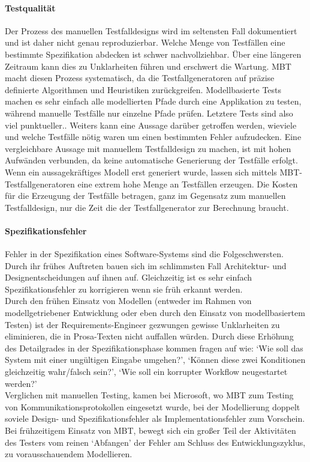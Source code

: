 \paragraph{Testqualität} Der Prozess des manuellen Testfalldesigns wird im seltensten Fall dokumentiert und ist daher nicht genau reproduzierbar. Welche Menge von Testfällen eine bestimmte Spezifikation abdecken ist schwer nachvollziehbar. Über eine längeren Zeitraum kann dies zu Unklarheiten führen und erschwert die Wartung\cite{utting_practical_2007}. MBT macht diesen Prozess systematisch, da die Testfallgeneratoren auf präzise definierte Algorithmen und Heuristiken zurückgreifen. Modellbasierte Tests machen es sehr einfach alle modellierten Pfade durch eine Applikation zu testen, während manuelle Testfälle nur einzelne Pfade prüfen. Letztere Tests sind also viel punktueller.. Weiters kann eine Aussage darüber getroffen werden, wieviele und welche Testfälle nötig waren um einen bestimmten Fehler aufzudecken. Eine vergleichbare Aussage mit manuellem Testfalldesign zu machen, ist mit hohen Aufwänden verbunden, da keine automatische Generierung der Testfälle erfolgt.\\
Wenn ein aussagekräftiges Modell erst generiert wurde, lassen sich mittels MBT-Testfallgeneratoren eine extrem hohe Menge an Testfällen erzeugen. Die Kosten für die Erzeugung der Testfälle betragen, ganz im Gegensatz zum manuellen Testfalldesign, nur die Zeit die der Testfallgenerator zur Berechnung braucht.

\paragraph{Spezifikationsfehler}
Fehler in der Spezifikation eines Software-Systems sind die Folgeschwersten\cite{utting_practical_2007}. Durch ihr frühes Auftreten bauen sich im schlimmsten Fall Architektur- und Designentscheidungen auf ihnen auf. Gleichzeitig ist es sehr einfach Spezifikationsfehler zu korrigieren wenn sie früh erkannt werden.\\
Durch den frühen Einsatz von Modellen (entweder im Rahmen von modellgetriebener Entwicklung oder eben durch den Einsatz von modellbasiertem Testen) ist der Requirements-Engineer gezwungen gewisse Unklarheiten zu eliminieren, die in Prosa-Texten nicht auffallen würden. Durch diese Erhöhung des Detailgrades in der Spezifikationsphase kommen fragen auf wie: `Wie soll das System mit einer ungültigen Eingabe umgehen?', `Können diese zwei Konditionen gleichzeitig wahr/falsch sein?', `Wie soll ein korrupter Workflow neugestartet werden?'\\
Verglichen mit manuellen Testing, kamen bei Microsoft, wo MBT zum Testing von Kommunikationsprotokollen eingesetzt wurde,  bei der Modellierung doppelt soviele Design- und Spezifikationsfehler als Implementationsfehler zum Vorschein\cite{stobie_model_2005}. Bei frühzeitigem Einsatz von MBT, bewegt sich ein großer Teil der Aktivitäten des Testers vom reinen `Abfangen' der Fehler am Schluss des Entwicklungszyklus, zu vorausschauendem Modellieren.

